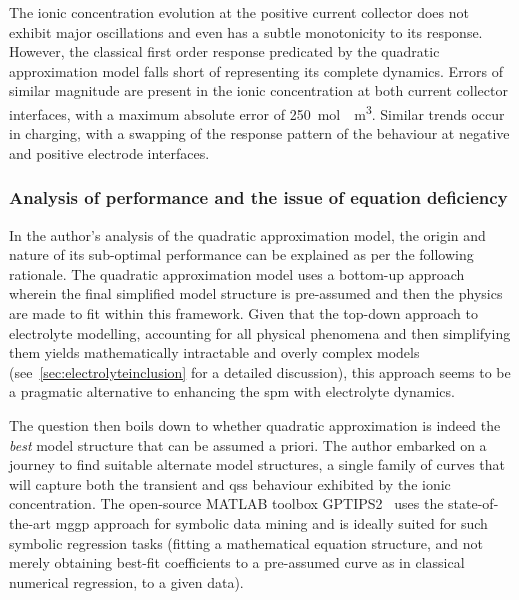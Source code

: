 The ionic  concentration evolution  at the positive  current collector  does not
exhibit major oscillations  and even has a subtle monotonicity  to its response.
However,  the  classical  first  order  response  predicated  by  the  quadratic
approximation model falls short of representing its complete dynamics. Errors of
similar  magnitude  are present  in  the  ionic  concentration at  both  current
collector  interfaces, with  a maximum  absolute error  of \approx\SI{250}{\mole
\per \meter  \cubed}. Similar trends occur  in charging, with a  swapping of the
response pattern of the behaviour at negative and positive electrode interfaces.


\subsubsection*{Analysis of performance and the issue of equation deficiency} In
the  author's analysis  of the  quadratic  approximation model,  the origin  and
nature of  its sub-optimal  performance can  be explained  as per  the following
rationale. The quadratic  approximation model uses a  bottom-up approach wherein
the final  simplified model structure  is pre-assumed  and then the  physics are
made  to  fit  within  this  framework. Given  that  the  top-down  approach  to
electrolyte  modelling, \ie{}  accounting for  all physical  phenomena and  then
simplifying  them yields  mathematically intractable  and overly  complex models
(see~\cref{sec:electrolyteinclusion} for  a detailed discussion),  this approach
seems to be a pragmatic alternative  to enhancing the \gls{spm} with electrolyte
dynamics.

The  question then  boils  down  to whether  quadratic  approximation is  indeed
the  \emph{best} model  structure  that  can be  assumed  a  priori. The  author
embarked  on a  journey to  find suitable  alternate model  structures, \ie{}  a
single  family of  curves that  will capture  both the  transient and  \gls{qss}
behaviour exhibited by  the ionic concentration. The  open-source MATLAB toolbox
GPTIPS2~\cite{Searson2015}  uses the  state-of-the-art  \gls{mggp} approach  for
symbolic data  mining and is ideally  suited for such symbolic  regression tasks
(fitting a  mathematical equation structure,  and not merely  obtaining best-fit
coefficients to a  pre-assumed curve as in classical numerical  regression, to a
given data).

